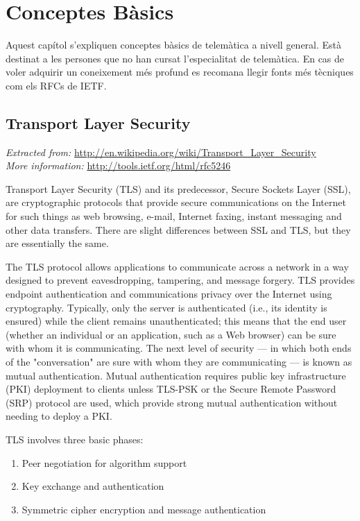 \chapter{Conceptes B\`asics}
Aquest capítol s'expliquen conceptes bàsics de telemàtica a nivell general. Està destinat a les persones que no han cursat l'especialitat de telemàtica. En cas de voler adquirir un coneixement més profund es recomana llegir fonts més tècniques com els RFCs de IETF.
 
\section{Transport Layer Security}
\emph{Extracted from:} \url{http://en.wikipedia.org/wiki/Transport_Layer_Security}\\
\emph{More information:} \url{http://tools.ietf.org/html/rfc5246}

Transport Layer Security (TLS) and its predecessor, Secure Sockets Layer (SSL), are cryptographic protocols that provide secure communications on the Internet for such things as web browsing, e-mail, Internet faxing, instant messaging and other data transfers. There are slight differences between SSL and TLS, but they are essentially the same.

The TLS protocol allows applications to communicate across a network in a way designed to prevent eavesdropping, tampering, and message forgery. TLS provides endpoint authentication and communications privacy over the Internet using cryptography. Typically, only the server is authenticated (i.e., its identity is ensured) while the client remains unauthenticated; this means that the end user (whether an individual or an application, such as a Web browser) can be sure with whom it is communicating. The next level of security --- in which both ends of the "conversation" are sure with whom they are communicating --- is known as mutual authentication. Mutual authentication requires public key infrastructure (PKI) deployment to clients unless TLS-PSK or the Secure Remote Password (SRP) protocol are used, which provide strong mutual authentication without needing to deploy a PKI.

TLS involves three basic phases:
\begin{enumerate}
\item Peer negotiation for algorithm support
\item Key exchange and authentication
\item Symmetric cipher encryption and message authentication
\end{enumerate}

